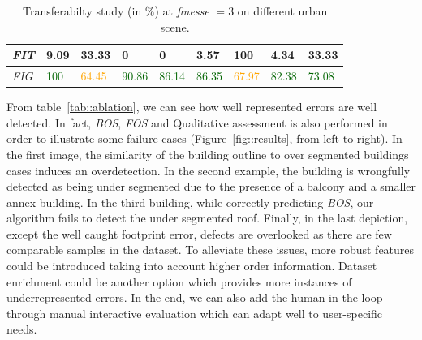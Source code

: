 \documentclass[conference]{IEEEtran}
\begin{document}
\begin{table}
\begin{center}
\begin{tabular}{|x{1cm} | x{1.2cm} x{1.2cm} | x{1.2cm} x{1.2cm} || x{1.2cm} x{1.2cm}| x{1.2cm} x{1.2cm}|}
            \hline
            \textit{FIT} & 9.09 & 33.33 & 0 & 0 & 3.57 & 100 & 4.34 & 33.33 \\
            \hline
            \textit{FIG} & \textcolor{darkgreen}{100} & \textcolor{orange}{64.45} & \textcolor{darkgreen}{90.86} & \textcolor{darkgreen}{86.14} & \textcolor{darkgreen}{86.35} & \textcolor{orange}{67.97} & \textcolor{darkgreen}{82.38} & \textcolor{darkgreen}{73.08} \\
            \hline
        \end{tabular}
        \vspace{-.5cm}
        \caption{\label{tab::transferability} Transferabilty study (in \%) at \textit{finesse} $= 3$ on different urban scene.}
	\end{center}
\end{table}

From table~\ref{tab::ablation}, we can see how well represented errors are well detected. In fact, \textit{BOS}, \textit{FOS} and \textit{}
Qualitative assessment is also performed in order to illustrate some failure cases (Figure~\ref{fig::results}, from left to right). In the first image, the similarity of the building outline to over segmented buildings cases induces an overdetection. In the second example, the building is wrongfully detected as being under segmented due to the presence of a balcony and a smaller annex building. In the third building, while correctly predicting \textit{BOS}, our algorithm fails to detect the under segmented roof. Finally, in the last depiction, except the well caught footprint error, defects are overlooked as there are few comparable samples in the dataset. To alleviate these issues, more robust features could be introduced taking into account higher order information. Dataset enrichment could be another option which provides more instances of underrepresented errors. In the end, we can also add the human in the loop through manual interactive evaluation which can adapt well to user-specific needs.
\end{document}

